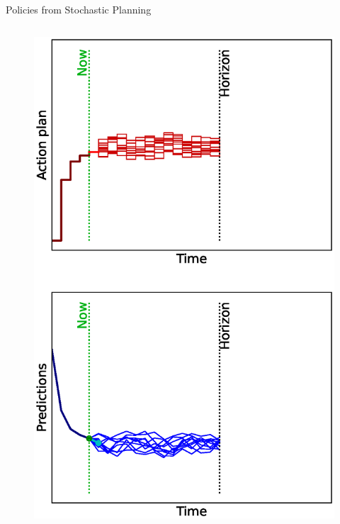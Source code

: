 \documentclass[lecture]{beamer}
\begin{document}
\begin{frame}{\normalsize Policies from Stochastic Planning}
\begin{columns}
\begin{overlayarea}{\textwidth}{0.9\textheight}
\begin{figure}
{          \includegraphics[width=\FS\textwidth,clip]{Codes/MPC/MPCMCWRONG4.eps}
        }%
        {%
}
\end{figure}
\end{overlayarea}
\end{columns}
\end{frame}
\end{document}
